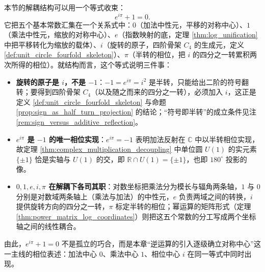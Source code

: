 \begin{remark}[$e^{i\pi}+1=0$：五个基本常数的汇合]\label{rem:euler_identity_closing}
本节的解耦结构可以用一个等式收束：
\[
e^{i\pi}+1=0.
\]
它把五个基本常数汇集在一个关系式中：$0$（加法中性元，平移的对称中心）、$1$（乘法中性元，缩放的对称中心）、$e$（指数映射的底，定理 \ref{thm:log_unification} 中把平移转化为缩放的载体）、$i$（旋转的原子，四阶骨架 $C_4$ 的生成元，定义 \ref{def:unit_circle_fourfold_skeleton}）、$\pi$（半转的相位，把 $i$ 的四分之一转累积两次所得的相位）。就结构而言，这个等式说明三件事：
\begin{itemize}
    \item \textbf{旋转的原子是 $i$，不是 $-1$}：$-1=e^{i\pi}=i^2$ 是半转，只能给出二阶的符号翻转；要得到四阶骨架 $C_4$（以及随之而来的四分之一转），必须加入 $i$，这正是定义 \ref{def:unit_circle_fourfold_skeleton} 与命题 \ref{prop:sign_as_half_turn_projection} 的结论；“符号即半转”的成立条件见注 \ref{rem:sign_versus_additive_reflection}。
    \item \textbf{$e^{i\pi}$ 是 $-1$ 的唯一相位实现}：$e^{i\pi}=-1$ 表明加法反射在 $\mathbb{C}$ 中以半转相位实现，故定理 \ref{thm:complex_multiplication_decoupling} 中单位圆 $U(1)$ 的实元素 $\{\pm1\}$ 恰是实轴与 $U(1)$ 的交，即 $\mathbb{R}\cap U(1)=\{\pm1\}$，也即 $180^\circ$ 投影的像。
    \item \textbf{$0,1,e,i,\pi$ 在解耦下各司其职}：对数坐标把乘法分为模长与辐角两条轴，$1$ 与 $0$ 分别是对数域两条轴上（乘法与加法）的中性元，$e$ 负责两域之间的转换，$i$ 提供旋转方向的四分之一转，$\pi$ 标定半转的相位；幂运算的矩阵形式（定理 \ref{thm:power_matrix_log_coordinates}）则把这五个常数的分工写成两个坐标轴之间的线性耦合。
\end{itemize}
由此，$e^{i\pi}+1=0$ 不是孤立的巧合，而是本章“逆运算的引入逐级确立对称中心”这一主线的相位表述：加法中心 $0$、乘法中心 $1$、相位中心 $i$ 在同一等式中同时出现。
\end{remark}

